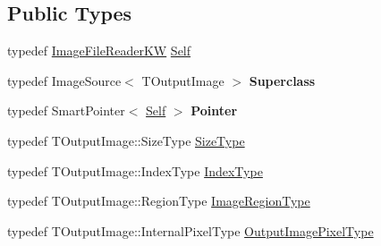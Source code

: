 \subsection*{Public Types}
\begin{DoxyCompactItemize}
\item 
typedef \hyperlink{classitk_1_1_image_file_reader_k_w}{Image\+File\+Reader\+KW} \hyperlink{classitk_1_1_image_file_reader_k_w_a6616e1e0fe9f4aceb7f693250b5f5b5c}{Self}
\item 
typedef Image\+Source$<$ T\+Output\+Image $>$ {\bfseries Superclass}\hypertarget{classitk_1_1_image_file_reader_k_w_afb5a9f09477bb47f45a4faf6832e74e4}{}\label{classitk_1_1_image_file_reader_k_w_afb5a9f09477bb47f45a4faf6832e74e4}

\item 
typedef Smart\+Pointer$<$ \hyperlink{classitk_1_1_image_file_reader_k_w_a6616e1e0fe9f4aceb7f693250b5f5b5c}{Self} $>$ {\bfseries Pointer}\hypertarget{classitk_1_1_image_file_reader_k_w_a05a8d76fe334c335c3c432de498ca087}{}\label{classitk_1_1_image_file_reader_k_w_a05a8d76fe334c335c3c432de498ca087}

\item 
typedef T\+Output\+Image\+::\+Size\+Type \hyperlink{classitk_1_1_image_file_reader_k_w_a7a7f4acf918af20f820cdb57ab4ae18d}{Size\+Type}
\item 
typedef T\+Output\+Image\+::\+Index\+Type \hyperlink{classitk_1_1_image_file_reader_k_w_a9daa1ecf6fe0192e6ea86f9bf9785912}{Index\+Type}
\item 
typedef T\+Output\+Image\+::\+Region\+Type \hyperlink{classitk_1_1_image_file_reader_k_w_aeb29601addf7afcf200728eafc93dccd}{Image\+Region\+Type}
\item 
typedef T\+Output\+Image\+::\+Internal\+Pixel\+Type \hyperlink{classitk_1_1_image_file_reader_k_w_a3bc68922731e94450245260bc9eced45}{Output\+Image\+Pixel\+Type}
\end{DoxyCompactItemize}
